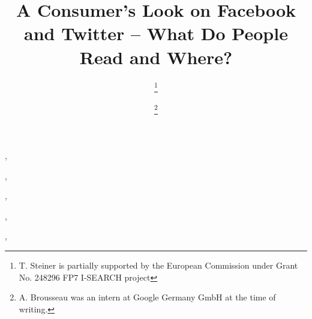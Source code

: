 \documentclass{iosart2c}
\begin{document}
\begin{frontmatter}

\title{A Consumer's Look on Facebook and Twitter -- What Do People Read and Where?}




\author[A]{ \thanks{T. Steiner is partially supported by the European Commission under Grant No. 248296 FP7 I-SEARCH project}},
\author[B]{ },
\author[A]{ \thanks{A. Brousseau was an intern at Google Germany GmbH at the time of writing.}},
\author[C]{ },
\author[B]{ },
\author[D]{ }


\address[A]{Google Germany GmbH, ABC-Str. 19, 20354 Hamburg, Germany,\\
E-mail: tomac@google.com, arnaud.brousseau@gmail.com}
\address[B]{Ghent University -- IBBT, ELIS, Multimedia Lab, Gaston Crommenlaan 8/201, 9050 Ghent, Belgium,\\
E-mail: ruben.verborgh@ugent.be, rik.vandewalle@ugent.be}
\address[C]{EURECOM, Sophia Antipolis, France\\
E-mail: raphael.troncy@eurecom.fr}
\address[D]{Universitat Polit\`{e}cnica de Catalunya, Department LSI, 08034 Barcelona, Spain,\\
E-mail: gabarro@lsi.upc.edu}


\end{frontmatter}
\end{document}

